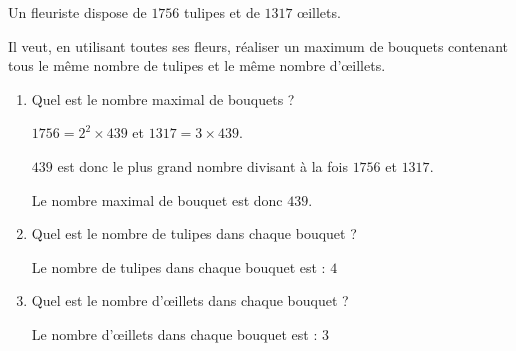     Un fleuriste dispose de $\num{1756}$ tulipes et de $\num{1317}$ \oe illets.

    Il veut, en utilisant toutes ses fleurs, réaliser un maximum de bouquets contenant tous le même nombre de tulipes et le même nombre d'\oe illets.
    \begin{enumerate}
        \item Quel est le nombre maximal de bouquets ?

        {\color{red} $\num{1756} = 2^2\times 439$ et $\num{1317} = 3\times 439$.

            $439$ est donc le plus grand nombre divisant à la fois $\num{1756}$ et $\num{1317}$.

            Le nombre maximal de bouquet est donc $439$.
        }
        \item Quel est le nombre de tulipes dans chaque bouquet ?

        {\color{red} Le nombre de tulipes dans chaque bouquet est : $4$}
        \item Quel est le nombre d'\oe illets dans chaque bouquet ?

        {\color{red} Le nombre d'\oe illets dans chaque bouquet est : $3$}
    \end{enumerate}
